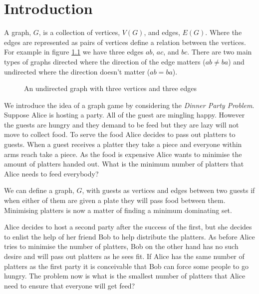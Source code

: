\chapter{Introduction}
A graph, $G$, is a collection of vertices, $V(G)$, and edges, $E(G)$. Where the edges are represented as pairs of vertices define a relation between the vertices. For example in figure \ref{fig:k3} we have three edges $ab$, $ac$, and $bc$. There are two main types of graphs directed where the direction of the edge matters ($ab\neq ba$) and undirected where the direction doesn't matter ($ab=ba$).

\begin{figure}[h]
    \centering
{}
    \caption{An undirected graph with three vertices and three edges}
\label{fig:k3}
\end{figure}
   
We introduce the idea of a graph game by considering the \textit{Dinner Party Problem}.
Suppose Alice is hosting a party. All of the guest are mingling happy. However the guests are hungry and they demand to be feed but they are lazy will not move to collect food. To serve the food Alice decides to pass out platters to guests. When a guest receives a platter they take a piece and everyone within arms reach take a piece. As the food is expensive Alice wants to minimise the amount of platters handed out. What is the minimum number of platters that Alice needs to feed everybody? 

We can define a graph, $G$, with guests as vertices and edges between two guests if when either of them are given a plate they will pass food between them. Minimising platters is now a matter of finding a minimum dominating set.

Alice decides to host a second party after the success of the first, but she decides to enlist the help of her friend Bob to help distribute the platters. As before Alice tries to minimise the number of platters, Bob on the other hand has no such desire and will pass out platters as he sees fit. If Alice has the same number of platters as the first party it is conceivable that Bob can force some people to go hungry. The problem now is what is the smallest number of platters that Alice need to ensure that everyone will get feed? 

